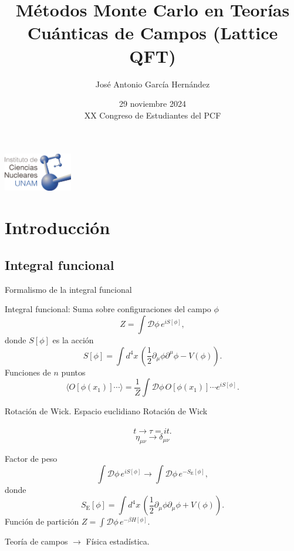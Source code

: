 \documentclass[11pt]{beamer}
\author{José Antonio García Hernández}
\title{Métodos Monte Carlo en Teorías Cuánticas de Campos (Lattice QFT)}
\institute{Instituto de Ciencias Nucleares, UNAM}
\date{29 noviembre 2024 \\ XX Congreso de Estudiantes del PCF}
\begin{document}
\begin{frame}
\titlepage
\includegraphics[width=3cm]{icn.png}
\end{frame}


\section{Introducción}
\subsection{Integral funcional}
\begin{frame}{Formalismo de la integral funcional}

    Integral funcional: Suma sobre configuraciones del campo $\phi$
    $$Z = \int \mathcal{D}\phi \, e^{iS[\phi]},$$
    donde $S[\phi]$ es la acción%
    $$ S[\phi] = \int d^4 x \, \left( \frac{1}{2}\partial_{\mu}\phi \partial^{\mu}\phi - V(\phi)\right).$$
    Funciones de $n$ puntos
    $$ \langle O[\phi(x_1)] \cdots \rangle =  \frac{1}{Z}\int \mathcal{D}\phi \, O[\phi(x_1)]\cdots e^{iS[\phi]}.$$
\end{frame}

\begin{frame}{Rotación de Wick. Espacio euclidiano}
    Rotación de Wick \\~
    $$ t \to \tau = i t.$$
    $$ \eta_{\mu\nu} \to \delta_{\mu\nu}$$
        
    Factor de peso 
        $$ \int \mathcal{D}\phi \, e^{iS[\phi]} \to  \int \mathcal{D}\phi \, e^{-S_{\text{E}}[\phi]},$$
        donde 
        $$ S_{\text{E}}[\phi] = \int d^4 x \, \left( \frac{1}{2}\partial_{\mu}\phi \partial_{\mu}\phi + V(\phi)\right).$$
        Función de partición $ Z = \int \mathcal{D}\phi\, e^{-\beta H[\phi]}$.
        
        Teoría de campos $\to$ Física estadística. 
\end{frame}
\end{document}
